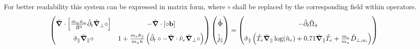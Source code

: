 For better readability this system can be expressed in matrix form, where $\circ$ shall be replaced by the corresponding field within operators.
\begin{equation}
\label{eq:vorticityEquation_ElectronInertia_dedimensionalized_matrix}
\renewcommand\arraystretch{1.8}
\begin{pmatrix}
\hat{\grad}\cdot\left[\frac{\hat{m}_\alpha \hat{n}_\alpha}{ \hat{B}^2}\hat{\partial}_t\hat{\grad}_\perp\circ\right] & 
- \hat{\grad}\cdot\left[\circ\mathbf{b}\right] \\
\hat{\sigma}_\parallel\hat{\grad}_\parallel\circ &
1 + \frac{m_e\hat{\sigma}_\parallel}{m_u\hat{n}}\left(\hat{\partial}_t\circ - \hat{\grad}\cdot\hat{\nu}_e\hat{\grad}_\perp\circ\right)
\end{pmatrix}
\begin{pmatrix}
\hat{\Phi} \\ \hat{j}_\parallel 
\end{pmatrix} = 
\begin{pmatrix}
-\hat{\partial}_t \hat{\Omega}_\pi \\
\hat{\sigma}_\parallel \left(\hat{T}_e\hat{\grad}_\parallel\log(\hat{n}_e) + 0.71\hat{\grad}_\parallel \hat{T}_e + \frac{m_e}{m_u}\hat{D}_{\perp,u_i}\right)
\end{pmatrix}
\end{equation}



